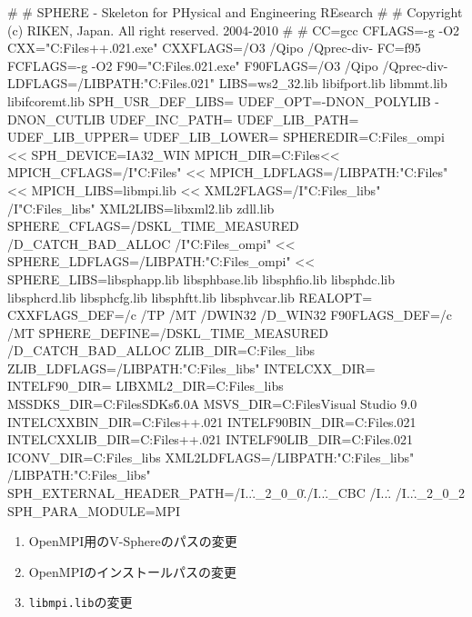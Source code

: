 {\small
\begin{program}
#
# SPHERE - Skeleton for PHysical and Engineering REsearch
#
# Copyright (c) RIKEN, Japan. All right reserved. 2004-2010
#
#
CC=gcc
CFLAGS=-g -O2
CXX="C:\Program Files\Intel\Compiler\C++.021\Bin\icl.exe"
CXXFLAGS=/O3 /Qipo /Qprec-div-
FC=f95
FCFLAGS=-g -O2
F90="C:\Program Files\Intel\Compiler\Fortran{}.021\Bin\ifort.exe"
F90FLAGS=/O3 /Qipo /Qprec-div-
LDFLAGS=/LIBPATH:"C:\Program Files\Intel\Compiler\Fortran{}.021\Lib"
LIBS=ws2_32.lib libifport.lib libmmt.lib libifcoremt.lib
SPH_USR_DEF_LIBS=
UDEF_OPT=-DNON_POLYLIB -DNON_CUTLIB
UDEF_INC_PATH=
UDEF_LIB_PATH=
UDEF_LIB_UPPER=
UDEF_LIB_LOWER=
SPHEREDIR=C:\Program Files\sphere_ompi <<
SPH_DEVICE=IA32_WIN
MPICH_DIR=C:\Program Files\OpenMPI <<
MPICH_CFLAGS=/I"C:\Program Files\OpenMPI" <<
MPICH_LDFLAGS=/LIBPATH:"C:\Program Files\OpenMPI\lib" <<
MPICH_LIBS=libmpi.lib <<
XML2FLAGS=/I"C:\Program Files\ext_libs" /I"C:\Program Files\ext_libs\iconv"
XML2LIBS=libxml2.lib zdll.lib
SPHERE_CFLAGS=/DSKL_TIME_MEASURED /D_CATCH_BAD_ALLOC /I"C:\Program Files\sphere_ompi" <<
SPHERE_LDFLAGS=/LIBPATH:"C:\Program Files\sphere_ompi\lib" <<
SPHERE_LIBS=libsphapp.lib libsphbase.lib libsphfio.lib libsphdc.lib libsphcrd.lib libsphcfg.lib 
            libsphftt.lib libsphvcar.lib
REALOPT=
CXXFLAGS_DEF=/c /TP /MT /DWIN32 /D_WIN32
F90FLAGS_DEF=/c /MT
SPHERE_DEFINE=/DSKL_TIME_MEASURED /D_CATCH_BAD_ALLOC
ZLIB_DIR=C:\Program Files\ext_libs\zlib
ZLIB_LDFLAGS=/LIBPATH:"C:\Program Files\ext_libs\zlib\lib"
INTELCXX_DIR=
INTELF90_DIR=
LIBXML2_DIR=C:\Program Files\ext_libs
MSSDKS_DIR=C:\Program Files\Microsoft SDKs\Windows\v6.0A
MSVS_DIR=C:\Program Files\Microsoft Visual Studio 9.0
INTELCXXBIN_DIR=C:\Program Files\Intel\Compiler\C++.021\Bin
INTELF90BIN_DIR=C:\Program Files\Intel\Compiler\Fortran{}.021\Bin
INTELCXXLIB_DIR=C:\Program Files\Intel\Compiler\C++.021\lib
INTELF90LIB_DIR=C:\Program Files\Intel\Compiler\Fortran{}.021\Lib
ICONV_DIR=C:\Program Files\ext_libs\iconv
XML2LDFLAGS=/LIBPATH:"C:\Program Files\ext_libs\lib" 
            /LIBPATH:"C:\Program Files\ext_libs\iconv\lib"
SPH_EXTERNAL_HEADER_PATH=/I..\..\Cutlib_2_0_0\..\FB /I..\..\F_CBC /I..\..\IP 
                         /I..\..\Polylib_2_0_2 
SPH_PARA_MODULE=MPI
\end{program}
}


\begin{enumerate}
\item OpenMPI用のV-Sphereのパスの変更
\item OpenMPIのインストールパスの変更
\item \verb|libmpi.lib|の変更
\end{enumerate}

